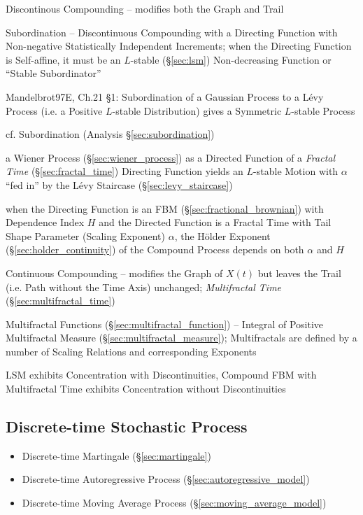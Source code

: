 Discontinous Compounding -- modifies both the Graph and Trail

Subordination -- Discontinuous Compounding with a Directing Function with
Non-negative Statistically Independent Increments;
when the Directing Function is Self-affine, it must be an $L$-stable
(\S\ref{sec:lsm}) Non-decreasing Function or ``Stable Subordinator''

Mandelbrot97E, Ch.21 \S 1: Subordination of a Gaussian Process to a L\'evy
Process (i.e. a Positive $L$-stable Distribution) gives a Symmetric $L$-stable
Process

\fist cf. Subordination (Analysis \S\ref{sec:subordination})

a Wiener Process (\S\ref{sec:wiener_process}) as a Directed Function of a
\emph{Fractal Time} (\S\ref{sec:fractal_time}) Directing Function yields an
$L$-stable Motion with $\alpha$ ``fed in'' by the L\'evy Staircase
(\S\ref{sec:levy_staircase})

when the Directing Function is an FBM (\S\ref{sec:fractional_brownian}) with
Dependence Index $H$ and the Directed Function is a Fractal Time with Tail Shape
Parameter (Scaling Exponent) $\alpha$, the H\"older Exponent
(\S\ref{sec:holder_continuity}) of the Compound Process depends on both $\alpha$
and $H$

Continuous Compounding -- modifies the Graph of $X(t)$ but leaves the Trail
(i.e. Path without the Time Axis) unchanged; \emph{Multifractal Time}
(\S\ref{sec:multifractal_time})

Multifractal Functions (\S\ref{sec:multifractal_function}) -- Integral of
Positive Multifractal Measure (\S\ref{sec:multifractal_measure}); Multifractals
are defined by a number of Scaling Relations and corresponding Exponents

LSM exhibits Concentration with Discontinuities, Compound FBM with Multifractal
Time exhibits Concentration without Discontinuities



\subsection{Discrete-time Stochastic Process}\label{sec:discretetime_stochastic}

\begin{itemize}
  \item Discrete-time Martingale (\S\ref{sec:martingale})
  \item Discrete-time Autoregressive Process (\S\ref{sec:autoregressive_model})
  \item Discrete-time Moving Average Process (\S\ref{sec:moving_average_model})
\end{itemize}

